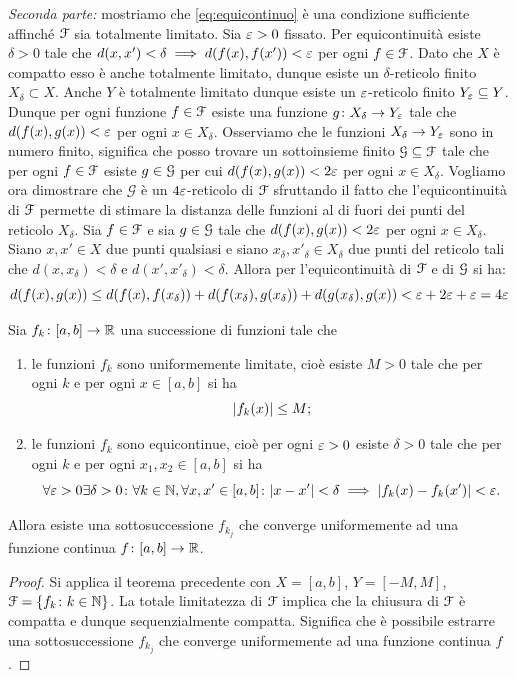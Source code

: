 \begin{theorem}
\emph{Seconda parte:} mostriamo che \eqref{eq:equicontinuo} è una condizione sufficiente
affinché $\mathcal F$ sia totalmente limitato.
Sia $\varepsilon>0$ fissato. 
Per equicontinuità esiste $\delta>0$ tale che $d(x,x')<\delta \implies d(f(x),f(x'))<\varepsilon$ per ogni $f\in \mathcal F$.
Dato che $X$ è compatto esso è anche totalmente limitato, dunque esiste 
un $\delta$-reticolo finito $X_\delta\subset X$.
Anche $Y$ è totalmente limitato dunque esiste un $\varepsilon$-reticolo finito $Y_\varepsilon\subseteq Y$.
Dunque per ogni funzione $f\in \mathcal F$ esiste una funzione $g\colon X_\delta \to Y_\varepsilon$ tale che
$d(f(x), g(x)) < \varepsilon$ per ogni $x\in X_\delta$.
Osserviamo che le funzioni $X_\delta \to Y_\varepsilon$ sono in numero finito, 
significa che posso trovare un sottoinsieme finito $\mathcal G\subseteq \mathcal F$ 
tale che per ogni $f\in \mathcal F$ esiste $g\in \mathcal G$ per cui $d(f(x), g(x)) < 2\varepsilon$ per ogni $x\in X_\delta$.
Vogliamo ora dimostrare che $\mathcal G$ è un $4\varepsilon$-reticolo di $\mathcal F$
sfruttando il fatto che l'equicontinuità di $\mathcal F$ permette di stimare la distanza 
delle funzioni al di fuori dei punti del reticolo $X_\delta$.
Sia $f\in \mathcal F$ e sia $g\in \mathcal G$ tale che $d(f(x), g(x)) < 2\varepsilon$ per ogni $x\in X_\delta$.
Siano $x,x'\in X$ due punti qualsiasi e siano $x_\delta,x'_\delta\in X_\delta$ 
due punti del reticolo tali che $d(x,x_\delta)<\delta$ e $d(x',x'_\delta)<\delta$.
Allora per l'equicontinuità di $\mathcal F$ e di $\mathcal G$ si ha:
\[
  d(f(x), g(x)) 
    \le d(f(x), f(x_\delta)) + d(f(x_\delta), g(x_\delta)) + d(g(x_\delta), g(x)) 
    < \varepsilon + 2\varepsilon + \varepsilon = 4\varepsilon
\]
\end{theorem}

\begin{corollary}
Sia $f_k\colon [a,b]\to {\mathbb R}$ una successione di funzioni tale che
\begin{enumerate}
\item le funzioni $f_k$ sono uniformemente limitate, cioè esiste
$M>0$ tale che per ogni $k$ e per ogni $x\in [a,b]$ si ha 
\[
  {\left|f_k(x)\right|} \le M;
\]
\item le funzioni $f_k$ sono equicontinue, cioè per ogni $\varepsilon>0$ esiste 
$\delta>0$ tale che per ogni $k$ e per ogni $x_1,x_2 \in [a,b]$ si ha 
\[
\forall \varepsilon>0 \exists \delta>0\colon \forall k\in {\mathbb N}, 
\forall x,x'\in [a,b]\colon
{\left|x-x'\right|}<\delta \implies 
{\left|f_k(x) - f_k(x')\right|} < \varepsilon.
\]
\end{enumerate}
Allora esiste una sottosuccessione $f_{k_j}$ che converge uniformemente
ad una funzione continua $f \colon [a,b] \to {\mathbb R}$.
\end{corollary}
\begin{proof}
Si applica il teorema precedente con $X=[a,b]$, $Y=[-M,M]$, 
$\mathcal F = \{f_k\colon k\in {\mathbb N}\}$. 
La totale limitatezza di $\mathcal F$ implica che la chiusura di $\mathcal F$ è 
compatta e dunque sequenzialmente compatta. 
Significa che è possibile estrarre una sottosuccessione $f_{k_j}$ che converge uniformemente 
ad una funzione continua $f$.
\end{proof}
